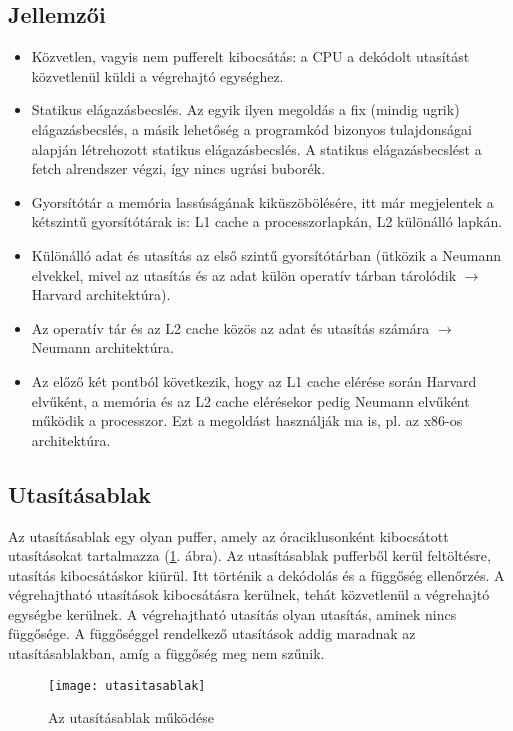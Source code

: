 \subsection{Jellemzői}
\begin{itemize}
    \item Közvetlen, vagyis nem pufferelt kibocsátás: a CPU a dekódolt utasítást közvetlenül küldi a végrehajtó egységhez.
    \item Statikus elágazásbecslés. Az egyik ilyen megoldás a fix (mindig ugrik) elágazásbecslés, a másik lehetőség a programkód bizonyos tulajdonságai alapján létrehozott statikus elágazásbecslés. A statikus elágazásbecslést a fetch alrendszer végzi, így nincs ugrási buborék.
    \item Gyorsítótár a memória lassúságának kiküszöbölésére, itt már megjelentek a kétszintű gyorsítótárak is: L1 cache a processzorlapkán, L2 különálló lapkán.
    \item Különálló adat és utasítás az első szintű gyorsítótárban (ütközik a Neumann elvekkel, mivel az utasítás és az adat külön operatív tárban tárolódik $\rightarrow$ Harvard architektúra).
    \item Az operatív tár és az L2 cache közös az adat és utasítás számára $\rightarrow$ Neumann architektúra.
    \item Az előző két pontból következik, hogy az L1 cache elérése során Harvard elvűként, a memória és az L2 cache elérésekor pedig Neumann elvűként működik a processzor. Ezt a megoldást használják ma is, pl. az x86-os architektúra.
\end{itemize}

\subsection{Utasításablak}
Az utasításablak egy olyan puffer, amely az óraciklusonként kibocsátott utasításokat tartalmazza (\ref{fig:utasitasablak}. ábra).
Az utasításablak pufferből kerül feltöltésre, utasítás kibocsátáskor kiürül. Itt történik a dekódolás és a függőség ellenőrzés.
A végrehajtható utasítások kibocsátásra kerülnek, tehát közvetlenül a végrehajtó egységbe kerülnek.
A végrehajtható utasítás olyan utasítás, aminek nincs függősége.
A függőséggel rendelkező utasítások addig maradnak az utasításablakban, amíg a függőség meg nem szűnik.
\begin{figure}[H]
    \texttt{[image: utasitasablak]}
    \centering
    \caption{Az utasításablak működése}
    \label{fig:utasitasablak}
\end{figure}
